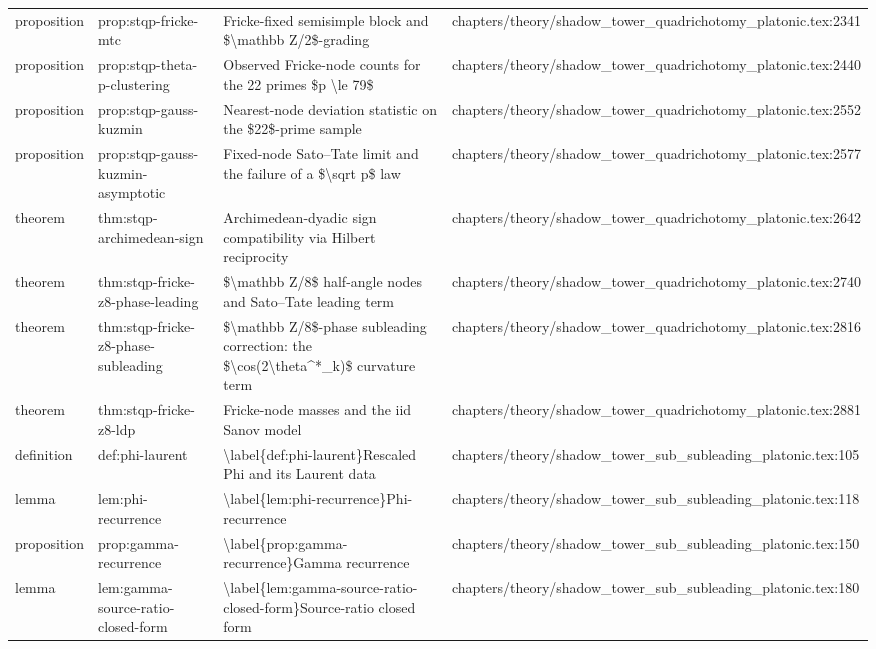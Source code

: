 \documentclass[11pt]{article}
\begin{document}
\begin{longtable}{L{0.10\textwidth}L{0.26\textwidth}L{0.42\textwidth}L{0.22\textwidth}}
proposition & prop:stqp-fricke-mtc & Fricke-fixed semisimple block and \$\textbackslash{}mathbb Z/2\$-grading & chapters/theory/shadow\_tower\_quadrichotomy\_platonic.tex:2341\\
proposition & prop:stqp-theta-p-clustering & Observed Fricke-node counts for the 22 primes \$p \textbackslash{}le 79\$ & chapters/theory/shadow\_tower\_quadrichotomy\_platonic.tex:2440\\
proposition & prop:stqp-gauss-kuzmin & Nearest-node deviation statistic on the \$22\$-prime sample & chapters/theory/shadow\_tower\_quadrichotomy\_platonic.tex:2552\\
proposition & prop:stqp-gauss-kuzmin-asymptotic & Fixed-node Sato--Tate limit and the failure of a \$\textbackslash{}sqrt p\$ law & chapters/theory/shadow\_tower\_quadrichotomy\_platonic.tex:2577\\
theorem & thm:stqp-archimedean-sign & Archimedean-dyadic sign compatibility via Hilbert reciprocity & chapters/theory/shadow\_tower\_quadrichotomy\_platonic.tex:2642\\
theorem & thm:stqp-fricke-z8-phase-leading & \$\textbackslash{}mathbb Z/8\$ half-angle nodes and Sato--Tate leading term & chapters/theory/shadow\_tower\_quadrichotomy\_platonic.tex:2740\\
theorem & thm:stqp-fricke-z8-phase-subleading & \$\textbackslash{}mathbb Z/8\$-phase subleading correction: the \$\textbackslash{}cos(2\textbackslash{}theta\textasciicircum{}*\_k)\$ curvature term & chapters/theory/shadow\_tower\_quadrichotomy\_platonic.tex:2816\\
theorem & thm:stqp-fricke-z8-ldp & Fricke-node masses and the iid Sanov model & chapters/theory/shadow\_tower\_quadrichotomy\_platonic.tex:2881\\
definition & def:phi-laurent & \textbackslash{}label\{def:phi-laurent\}Rescaled Phi and its Laurent data & chapters/theory/shadow\_tower\_sub\_subleading\_platonic.tex:105\\
lemma & lem:phi-recurrence & \textbackslash{}label\{lem:phi-recurrence\}Phi-recurrence & chapters/theory/shadow\_tower\_sub\_subleading\_platonic.tex:118\\
proposition & prop:gamma-recurrence & \textbackslash{}label\{prop:gamma-recurrence\}Gamma recurrence & chapters/theory/shadow\_tower\_sub\_subleading\_platonic.tex:150\\
lemma & lem:gamma-source-ratio-closed-form & \textbackslash{}label\{lem:gamma-source-ratio-closed-form\}Source-ratio closed form & chapters/theory/shadow\_tower\_sub\_subleading\_platonic.tex:180\\

\end{longtable}
\end{document}
